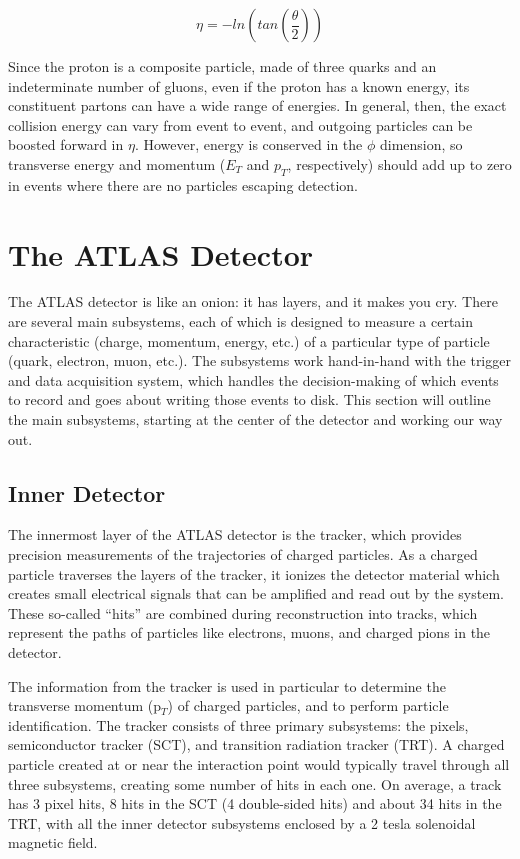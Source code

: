 \begin{equation}
\eta = -ln(tan( \frac{\theta}{2} ))
\end{equation}

Since the proton is a composite particle, made of three quarks and an indeterminate number of gluons, even if the proton has a known energy, its constituent partons can have a wide range of energies.  In general, then, the exact collision energy can vary from event to event, and outgoing particles can be boosted forward in $\eta$.  However, energy is conserved in the $\phi$ dimension, so transverse energy and momentum ($E_T$ and $p_T$, respectively) should add up to zero in events where there are no particles escaping detection.

\section{The ATLAS Detector}
The ATLAS detector is like an onion: it has layers, and it makes you cry.  There are several main subsystems, each of which is designed to measure a certain characteristic (charge, momentum, energy, etc.) of a particular type of particle (quark, electron, muon, etc.).  The subsystems work hand-in-hand with the trigger and data acquisition system, which handles the decision-making of which events to record and goes about writing those events to disk.  This section will outline the main subsystems, starting at the center of the detector and working our way out.

\subsection{Inner Detector}
The innermost layer of the ATLAS detector is the tracker, which provides precision measurements of the trajectories of charged particles.  As a charged particle traverses the layers of the tracker, it ionizes the detector material which creates small electrical signals that can be amplified and read out by the system.  These so-called ``hits'' are combined during reconstruction into tracks, which represent the paths of particles like electrons, muons, and charged pions in the detector.

The information from the tracker is used in particular to determine the transverse momentum (p$_T$) of charged particles, and to perform particle identification.  The tracker consists of three primary subsystems: the pixels, semiconductor tracker (SCT), and transition radiation tracker (TRT).  A charged particle created at or near the interaction point would typically travel through all three subsystems, creating some number of hits in each one.  On average, a track has 3 pixel hits, 8 hits in the SCT (4 double-sided hits) and about 34 hits in the TRT, with all the inner detector subsystems enclosed by a 2 tesla solenoidal magnetic field. 



